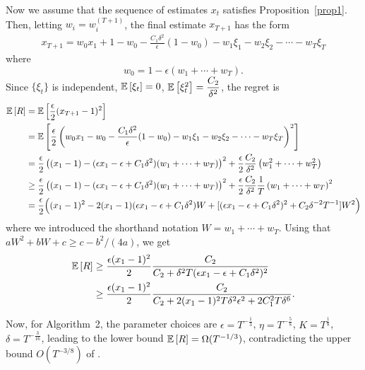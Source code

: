 \documentclass[11pt,letterpaper,english]{article}
\begin{document}
Now we assume that the sequence of estimates $x_t$ satisfies Proposition~\ref{prop1}. Then, letting $w_i=w^{(T+1)}_i$, the final estimate $x_{T+1}$ has the form
\begin{align*}
x_{T+1} = w_0 x_1 + 1-w_0 -\frac{C_1 \delta^2 }{\epsilon}(1-w_0) -w_1 \xi_1 - w_2 \xi_2 - \cdots - w_T \xi_T
\end{align*}
where
\[w_0 = 1-\epsilon (w_1+\cdots+w_T).\]
Since $\{\xi_t\}$ is independent, $\mathbb{E}\left[\xi_t\right]=0$, $\mathbb{E}\left[\xi_t^2\right]=\dfrac{C_2}{\delta^2}$, 
the regret is
\begin{align}
\mathbb{E}\left[R\right] &=\mathbb{E}\left[ \frac{\epsilon}{2} (x_{T+1}-1)^2\right] \nonumber \\
&= \mathbb{E}\left[\frac{\epsilon}{2} \left(w_0 x_1 -w_0 -\frac{C_1 \delta^2 }{\epsilon}(1-w_0) -w_1 \xi_1 - w_2 \xi_2 - \cdots - w_T \xi_T  \right)^2\right] \nonumber \\
&= \frac{\epsilon}{2} \left( (x_1-1)-(\epsilon x_1 -\epsilon +C_1\delta^2)(w_1+\cdots+w_T) \right)^2 + \dfrac{\epsilon}{2} \dfrac{C_2}{\delta^2} \left(w_1^2+\cdots+w_T^2  \right) \label{eq:lb2}\\
&\geq \dfrac{\epsilon}{2} \left( (x_1-1)-(\epsilon x_1 -\epsilon +C_1\delta^2)(w_1+\cdots+w_T) \right)^2 + \dfrac{\epsilon}{2} \dfrac{C_2}{\delta^2}\dfrac{1}{T} \left(w_1+\cdots+w_T  \right)^2 \nonumber \\
&= \frac{\epsilon}{2} \Bigl( (x_1-1)^2-2(x_1-1)(\epsilon x_1-\epsilon +C_1 \delta^2)W + [(\epsilon x_1-\epsilon +C_1 \delta^2)^2+C_2 \delta^{-2}T^{-1}]W^2  \Bigr)  \nonumber
\end{align}
where we introduced the shorthand notation $W = w_1+\cdots+w_T$.
Using that $a W^2 + bW +c \ge c-b^2/(4a)$, we get 
\begin{align*}
\mathbb{E}\left[R\right]  &\ge \frac{\epsilon (x_1-1)^2}{2} \frac{C_2}{C_2 + \delta^2 T(\epsilon x_1 - \epsilon +C_1 \delta^2)^2} \\
& \ge \frac{\epsilon (x_1-1)^2}{2} \frac{C_2}{C_2 + 2(x_1-1)^2 T \delta^2 \epsilon^2+ 2 C_1^2 T \delta^6}.
\end{align*}

Now, for Algorithm~2, the parameter choices are $\epsilon = T^{-\frac{1}{3}}$, $\eta = T^{-\frac{5}{8}}$, $K = T^{\frac{1}{8}}$, $\delta=T^{-\frac{3}{16}}$, leading to the lower bound $\mathbb{E}\left[R\right] = \Omega(T^{-1/3})$, contradicting the upper bound $O(T^{-3/8})$ of \citet{DekelEK15}.




\end{document}

